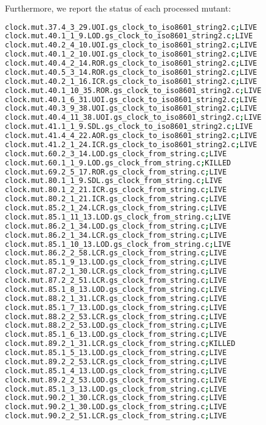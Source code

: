 Furthermore, we report the status of each processed mutant:

\begin{lstlisting}[language=bash, label=statuses, caption=Mutants statuses.]
clock.mut.37.4_3_29.UOI.gs_clock_to_iso8601_string2.c;LIVE
clock.mut.40.1_1_9.LOD.gs_clock_to_iso8601_string2.c;LIVE
clock.mut.40.2_4_10.UOI.gs_clock_to_iso8601_string2.c;LIVE
clock.mut.40.1_2_10.UOI.gs_clock_to_iso8601_string2.c;LIVE
clock.mut.40.4_2_14.ROR.gs_clock_to_iso8601_string2.c;LIVE
clock.mut.40.5_3_14.ROR.gs_clock_to_iso8601_string2.c;LIVE
clock.mut.40.2_1_16.ICR.gs_clock_to_iso8601_string2.c;LIVE
clock.mut.40.1_10_35.ROR.gs_clock_to_iso8601_string2.c;LIVE
clock.mut.40.1_6_31.UOI.gs_clock_to_iso8601_string2.c;LIVE
clock.mut.40.3_9_38.UOI.gs_clock_to_iso8601_string2.c;LIVE
clock.mut.40.4_11_38.UOI.gs_clock_to_iso8601_string2.c;LIVE
clock.mut.41.1_1_9.SDL.gs_clock_to_iso8601_string2.c;LIVE
clock.mut.41.4_4_22.AOR.gs_clock_to_iso8601_string2.c;LIVE
clock.mut.41.2_1_24.ICR.gs_clock_to_iso8601_string2.c;LIVE
clock.mut.60.2_3_14.LOD.gs_clock_from_string.c;LIVE
clock.mut.60.1_1_9.LOD.gs_clock_from_string.c;KILLED
clock.mut.69.2_5_17.ROR.gs_clock_from_string.c;LIVE
clock.mut.80.1_1_9.SDL.gs_clock_from_string.c;LIVE
clock.mut.80.1_2_21.ICR.gs_clock_from_string.c;LIVE
clock.mut.80.2_1_21.ICR.gs_clock_from_string.c;LIVE
clock.mut.85.2_1_24.LCR.gs_clock_from_string.c;LIVE
clock.mut.85.1_11_13.LOD.gs_clock_from_string.c;LIVE
clock.mut.86.2_1_34.LOD.gs_clock_from_string.c;LIVE
clock.mut.86.2_1_34.LCR.gs_clock_from_string.c;LIVE
clock.mut.85.1_10_13.LOD.gs_clock_from_string.c;LIVE
clock.mut.86.2_2_58.LCR.gs_clock_from_string.c;LIVE
clock.mut.85.1_9_13.LOD.gs_clock_from_string.c;LIVE
clock.mut.87.2_1_30.LCR.gs_clock_from_string.c;LIVE
clock.mut.87.2_2_51.LCR.gs_clock_from_string.c;LIVE
clock.mut.85.1_8_13.LOD.gs_clock_from_string.c;LIVE
clock.mut.88.2_1_31.LCR.gs_clock_from_string.c;LIVE
clock.mut.85.1_7_13.LOD.gs_clock_from_string.c;LIVE
clock.mut.88.2_2_53.LCR.gs_clock_from_string.c;LIVE
clock.mut.88.2_2_53.LOD.gs_clock_from_string.c;LIVE
clock.mut.85.1_6_13.LOD.gs_clock_from_string.c;LIVE
clock.mut.89.2_1_31.LCR.gs_clock_from_string.c;KILLED
clock.mut.85.1_5_13.LOD.gs_clock_from_string.c;LIVE
clock.mut.89.2_2_53.LCR.gs_clock_from_string.c;LIVE
clock.mut.85.1_4_13.LOD.gs_clock_from_string.c;LIVE
clock.mut.89.2_2_53.LOD.gs_clock_from_string.c;LIVE
clock.mut.85.1_3_13.LOD.gs_clock_from_string.c;LIVE
clock.mut.90.2_1_30.LCR.gs_clock_from_string.c;LIVE
clock.mut.90.2_1_30.LOD.gs_clock_from_string.c;LIVE
clock.mut.90.2_2_51.LCR.gs_clock_from_string.c;LIVE

\end{lstlisting}
